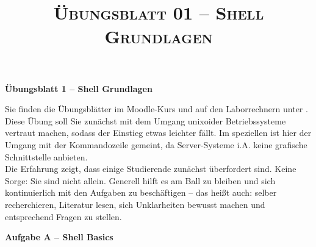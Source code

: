 \documentclass[paper=a4,fontsize=11pt]{scrartcl}%
\title{	
\normalfont \normalsize 
\textsc{Übungsblatt 01 -- Shell Grundlagen}
}
\numberwithin{equation}{section}
\begin{document}
\begin{center}
\Large{\textbf{Übungsblatt 1 -- Shell Grundlagen}}
\end{center}
Sie finden die Übungsblätter im Moodle-Kurs und auf den Laborrechnern unter .\\
\linebreak[4]
Diese Übung soll Sie zunächst mit dem Umgang unixoider Betriebssysteme vertraut machen, sodass der Einstieg etwas leichter fällt. Im speziellen ist hier der Umgang mit der Kommandozeile gemeint, da Server-Systeme i.A. keine grafische Schnittstelle anbieten.\\
Die Erfahrung zeigt, dass einige Studierende zunächst überfordert sind. Keine Sorge: Sie sind nicht allein. Generell hilft es am Ball zu bleiben und sich kontinuierlich mit den Aufgaben zu beschäftigen -- das heißt auch: selber recherchieren, Literatur lesen, sich Unklarheiten bewusst machen und entsprechend Fragen zu stellen.
\begin{center}\Large{\textbf{Aufgabe A -- Shell Basics}}\end{center}\vskip0.25in
\end{document}

